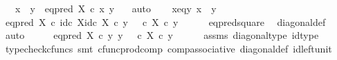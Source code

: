 \begin{isabellebody}
\ \ \ {\isachardoublequoteopen}{\isacharparenleft}{\kern0pt}x\ {\isacharequal}{\kern0pt}\ y{\isacharparenright}{\kern0pt}\ {\isacharequal}{\kern0pt}\ {\isacharparenleft}{\kern0pt}eq{\isacharunderscore}{\kern0pt}pred\ X\ {\isasymcirc}\isactrlsub c\ {\isasymlangle}x{\isacharcomma}{\kern0pt}\ y{\isasymrangle}\ {\isacharequal}{\kern0pt}\ {\isasymt}{\isacharparenright}{\kern0pt}{\isachardoublequoteclose}\isanewline
%
\isadelimproof
%
\endisadelimproof
%
\isatagproof
{}\isamarkupfalse%
\ auto\isanewline
\ \ \isamarkupfalse%
\ x{\isacharunderscore}{\kern0pt}eq{\isacharunderscore}{\kern0pt}y{\isacharcolon}{\kern0pt}\ {\isachardoublequoteopen}x\ {\isacharequal}{\kern0pt}\ y{\isachardoublequoteclose}\isanewline
\isanewline
\ \ \isamarkupfalse%
\ {\isachardoublequoteopen}{\isacharparenleft}{\kern0pt}eq{\isacharunderscore}{\kern0pt}pred\ X\ {\isasymcirc}\isactrlsub c\ {\isasymlangle}id\isactrlsub c\ X{\isacharcomma}{\kern0pt}id\isactrlsub c\ X{\isasymrangle}{\isacharparenright}{\kern0pt}\ {\isasymcirc}\isactrlsub c\ y\ {\isacharequal}{\kern0pt}\ {\isacharparenleft}{\kern0pt}{\isasymt}\ {\isasymcirc}\isactrlsub c\ {\isasymbeta}\isactrlbsub X\isactrlesub {\isacharparenright}{\kern0pt}\ {\isasymcirc}\isactrlsub c\ y{\isachardoublequoteclose}\isanewline
\ \ \ \ \isamarkupfalse%
\ eq{\isacharunderscore}{\kern0pt}pred{\isacharunderscore}{\kern0pt}square\ \isamarkupfalse%
\ diagonal{\isacharunderscore}{\kern0pt}def\ \isamarkupfalse%
\ auto\isanewline
\ \ \isamarkupfalse%
\ \isamarkupfalse%
\ {\isachardoublequoteopen}eq{\isacharunderscore}{\kern0pt}pred\ X\ {\isasymcirc}\isactrlsub c\ {\isasymlangle}y{\isacharcomma}{\kern0pt}\ y{\isasymrangle}\ {\isacharequal}{\kern0pt}\ {\isacharparenleft}{\kern0pt}{\isasymt}\ {\isasymcirc}\isactrlsub c\ {\isasymbeta}\isactrlbsub X\isactrlesub {\isacharparenright}{\kern0pt}\ {\isasymcirc}\isactrlsub c\ y{\isachardoublequoteclose}\isanewline
\ \ \ \ \isamarkupfalse%
\ assms\ diagonal{\isacharunderscore}{\kern0pt}type\ id{\isacharunderscore}{\kern0pt}type\isanewline
\ \ \ \ \isamarkupfalse%
\ {\isacharparenleft}{\kern0pt}typecheck{\isacharunderscore}{\kern0pt}cfuncs{\isacharcomma}{\kern0pt}\ smt\ cfunc{\isacharunderscore}{\kern0pt}prod{\isacharunderscore}{\kern0pt}comp\ comp{\isacharunderscore}{\kern0pt}associative{}\ diagonal{\isacharunderscore}{\kern0pt}def\ id{\isacharunderscore}{\kern0pt}left{\isacharunderscore}{\kern0pt}unit{}{\isacharparenright}{\kern0pt}\isanewline

\end{isabellebody}

